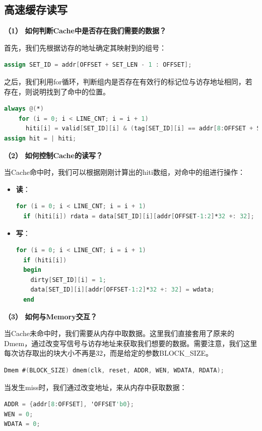 \documentclass[12pt]{article} %
\begin{document}
\begin{sloppypar}
\subsection{高速缓存读写}

\noindent
{\bf （1） 如何判断Cache中是否存在我们需要的数据？}

首先，我们先根据访存的地址确定其映射到的组号：
\begin{lstlisting}[language=Verilog]
assign SET_ID = addr[OFFSET + SET_LEN - 1 : OFFSET];
\end{lstlisting} 

之后，我们利用for循环，判断组内是否存在有效行的标记位与访存地址相同，若存在，则说明找到了命中的位置。
\begin{lstlisting}[language=Verilog]
always @(*)
    for (i = 0; i < LINE_CNT; i = i + 1)
      hiti[i] = valid[SET_ID][i] & (tag[SET_ID][i] == addr[8:OFFSET + SET_LEN]);
assign hit = | hiti;
\end{lstlisting} 


\noindent
{\bf （2） 如何控制Cache的读写？}

当Cache命中时，我们可以根据刚刚计算出的hiti数组，对命中的组进行操作：
\begin{itemize}
\item {\bf 读}：
\begin{lstlisting}[language=Verilog]
for (i = 0; i < LINE_CNT; i = i + 1)
  if (hiti[i]) rdata = data[SET_ID][i][addr[OFFSET-1:2]*32 +: 32];
\end{lstlisting}
\item {\bf 写}： 
\begin{lstlisting}[language=Verilog]
for (i = 0; i < LINE_CNT; i = i + 1)
  if (hiti[i])
  begin
    dirty[SET_ID][i] = 1;
    data[SET_ID][i][addr[OFFSET-1:2]*32 +: 32] = wdata;
  end
\end{lstlisting} 
\end{itemize}

\noindent
{\bf （3） 如何与Memory交互？}

当Cache未命中时，我们需要从内存中取数据。这里我们直接套用了原来的Dmem，通过改变写信号与访存地址来获取我们想要的数据。需要注意，我们这里每次访存取出的块大小不再是32，而是给定的参数BLOCK\_SIZE。
\begin{lstlisting}[language=Verilog]    
Dmem #(BLOCK_SIZE) dmem(clk, reset, ADDR, WEN, WDATA, RDATA);
\end{lstlisting} 

当发生miss时，我们通过改变地址，来从内存中获取数据：
\begin{lstlisting}[language=Verilog]    
ADDR = {addr[8:OFFSET], 'OFFSET'b0};
WEN = 0;
WDATA = 0;
\end{lstlisting} 


\end{sloppypar}
\end{document}

